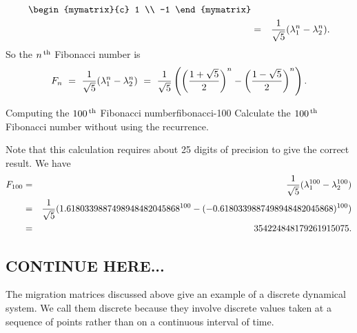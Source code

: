 \begin{solution}
\begin{eqnarray*}
        \begin{mymatrix}{c} 1 \\ -1 \end{mymatrix} \\
    &=& \frac{1}{\sqrt{5}} (\eigenvar_1^n - \eigenvar_2^n).
  \end{eqnarray*}
  So the $n^{\,\rm th}$ Fibonacci number is
  \begin{equation*}
    F_n
    ~=~ \frac{1}{\sqrt{5}} (\lambda_1^n - \lambda_2^n)
    ~=~ \frac{1}{\sqrt{5}}
    \left(\left(\frac{1+\sqrt{5}}{2}\right)^n - \left(\frac{1-\sqrt{5}}{2}\right)^n\right).
  \end{equation*}
\end{solution}

\begin{example}{Computing the $100^{\,\rm th}$ Fibonacci number}{fibonacci-100}
  Calculate the $100^{\,\rm th}$ Fibonacci number without using the recurrence.
\end{example}

\begin{solution}
  Note that this calculation requires about 25 digits of precision to
  give the correct result. We
  have
  \begin{eqnarray*}
    F_{100}
    &=& \frac{1}{\sqrt{5}} (\lambda_1^{100} - \lambda_2^{100}) \\
    &=& \frac{1}{\sqrt{5}} (1.6180339887498948482045868^{100} - (-0.6180339887498948482045868)^{100}) \\
    &=& 354224848179261915075.
  \end{eqnarray*}
\end{solution}

\subsection{CONTINUE HERE...}

The migration matrices discussed above give an example of a discrete
dynamical system. We call them discrete because they involve discrete
values taken at a sequence of points rather than on a continuous
interval of time.

